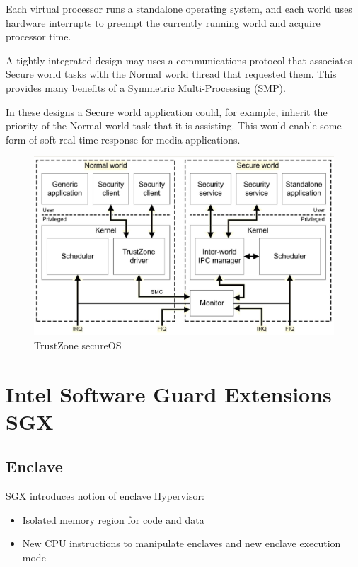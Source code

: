 Each virtual processor runs a standalone operating system, and each world uses
hardware interrupts to preempt the currently running world and acquire
processor time.

A tightly integrated design may uses a communications protocol that associates Secure world tasks with the Normal world thread that requested them. 
This provides many benefits of a Symmetric Multi-Processing (SMP).

In these designs a Secure world application could, for example, inherit the priority of the Normal world task that it is assisting. This would enable some form of soft real-time response for media applications.

\begin{figure}[htbp]
   \centering
   \includegraphics{images/TrustZone_secureOS.png}
   \caption{TrustZone secureOS}
   \label{fig:TrustZone_secureOS}
\end{figure}

\section{Intel Software Guard Extensions SGX}
\subsection{Enclave}



SGX introduces notion of enclave Hypervisor:
\begin{itemize}
   \item Isolated memory region for code and data
   \item New CPU instructions to manipulate enclaves
   and new enclave execution mode
\end{itemize}

